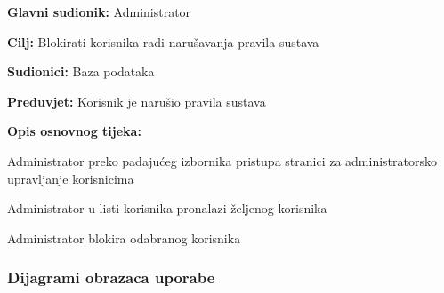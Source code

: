 					\noindent {}
					\begin{packed_item}
						
						\item \textbf{Glavni sudionik: } Administrator
						\item  \textbf{Cilj:} Blokirati korisnika radi narušavanja pravila sustava
						\item  \textbf{Sudionici:} Baza podataka
						\item  \textbf{Preduvjet:} Korisnik je narušio pravila sustava
						\item  \textbf{Opis osnovnog tijeka:}
						
						\item[] \begin{packed_enum}
							
							\item Administrator preko padajućeg izbornika pristupa stranici za administratorsko upravljanje korisnicima
							\item Administrator u listi korisnika pronalazi željenog korisnika
							\item Administrator blokira odabranog korisnika
							
						\end{packed_enum}
					\end{packed_item}	
				\eject				
				\subsubsection{Dijagrami obrazaca uporabe}
					
